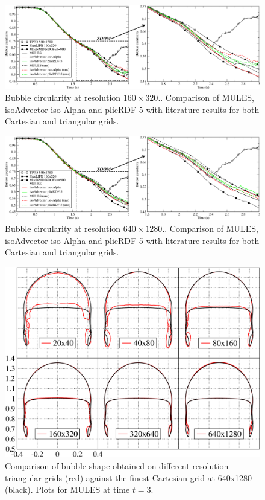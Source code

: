 \documentclass[review]{elsarticle}
\begin{document}
\begin{figure}[!h]
  \includegraphics[width=\textwidth]{figures/HysingB_bubble_circularity_160x320.pdf}
  \caption{Bubble circularity at resolution $160\times320.$. Comparison of MULES, isoAdvector iso-Alpha and plicRDF-5 with literature results for both Cartesian and triangular grids.}
  \label{fig:HB_bubble_circularity160}
\end{figure}

\begin{figure}[!h]
  \includegraphics[width=\textwidth]{figures/HysingB_bubble_circularity_640x1280.pdf}
  \caption{Bubble circularity at resolution $640\times1280.$. Comparison of MULES, isoAdvector iso-Alpha and plicRDF-5 with literature results for both Cartesian and triangular grids.}
  \label{fig:HB_bubble_circularity640}
\end{figure}


\begin{figure}[!h]
  \includegraphics[width=\textwidth]{figures/bubble_shape_t=3_compareOFMULES_Fineststruct_vs_uns_grids.pdf}
  \caption{Comparison of bubble shape obtained on different resolution triangular grids (red) against the finest Cartesian grid at 640x1280 (black). Plots for MULES at time $t=3$.}
  \label{fig:HB_compareOFMULES_Fineststruct.vs.uns}
\end{figure}
\end{document}
